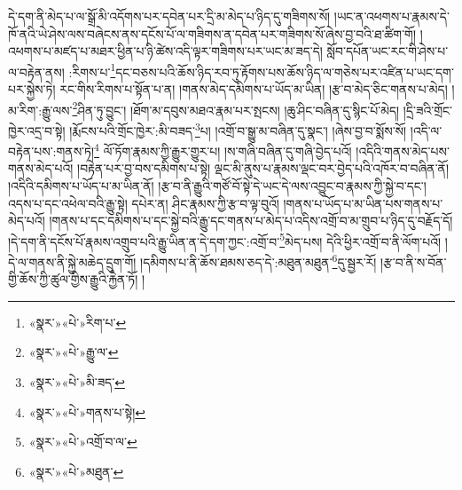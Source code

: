 དེ་དག་ནི་མེད་པ་ལ་སྒྲོ་མི་འདོགས་པར་དབེན་པར་དྲི་མ་མེད་པ་ཉིད་དུ་གཟིགས་སོ། །ཡང་ན་འཕགས་པ་རྣམས་དེ་ཁོ་ནའི་ཡེ་ཤེས་ལས་བཞེངས་ནས་དངོས་པོ་ལ་གཟིགས་ན་དབེན་པར་གཟིགས་སོ་ཞེས་བྱ་བའི་ཐ་ཚིག་གོ། །འཕགས་པ་མཛད་པ་མཐར་ཕྱིན་པ་ཉི་ཚེས་འདི་ལྟར་གཟིགས་པར་ཡང་མ་ཟད་དེ། སློབ་དཔོན་ཡང་རང་གི་ཤེས་པ་ལ་བརྟེན་ནས། :རིགས་པ་\footnote{«སྣར་»«པེ་»རིག་པ་}དང་བཅས་པའི་ཆོས་ཉིད་རབ་ཏུ་རྟོགས་པས་ཆོས་ཉིད་ལ་གཅེས་པར་འཛིན་པ་ཡང་དག་པར་སྐྱེས་ཏེ། རང་གིས་རིགས་པ་སྟོན་པ་ན། །གནས་མེད་དམིགས་པ་ཡོད་མ་ཡིན། །རྩ་བ་མེད་ཅིང་གནས་པ་མེད། །མ་རིག་:རྒྱུ་ལས་\footnote{«སྣར་»«པེ་»རྒྱུ་ལ་}ཤིན་ཏུ་བྱུང་། །ཐོག་མ་དབུས་མཐའ་རྣམ་པར་སྤངས། །ཆུ་ཤིང་བཞིན་དུ་སྙིང་པོ་མེད། །དྲི་ཟའི་གྲོང་ཁྱེར་འདྲ་བ་སྟེ། །རྨོངས་པའི་གྲོང་ཁྱེར་:མི་བཟད་\footnote{«སྣར་»«པེ་»མི་ཟད་}པ། །འགྲོ་བ་སྒྱུ་མ་བཞིན་དུ་སྣང་། །ཞེས་བྱ་བ་སྨོས་སོ། །འདི་ལ་བརྟེན་པས་:གནས་ཏེ།\footnote{«སྣར་»«པེ་»གནས་པ་སྟེ།} ལོ་ཏོག་རྣམས་ཀྱི་རྒྱུར་གྱུར་པ། །ས་གཞི་བཞིན་དུ་གཞི་བྱེད་པའོ། །འདིའི་གནས་མེད་པས་གནས་མེད་པའོ། །བརྟེན་པར་བྱ་བས་དམིགས་པ་སྟེ། ལྡང་མི་ནུས་པ་རྣམས་ལྡང་བར་བྱེད་པའི་འཁོར་བ་བཞིན་ནོ། །འདིའི་དམིགས་པ་ཡོད་པ་མ་ཡིན་ནོ། །རྩ་བ་ནི་རྒྱུའི་གཙོ་བོ་སྟེ་དེ་ཡང་དེ་ལས་འབྱུང་བ་རྣམས་ཀྱི་སྐྱེ་བ་དང་། འདས་པ་དང་འཕེལ་བའི་རྒྱུ་སྟེ། དཔེར་ན། ཤིང་རྣམས་ཀྱི་རྩ་བ་ལྟ་བུའོ། །གནས་པ་ཡོད་པ་མ་ཡིན་པས་གནས་པ་མེད་པའོ། །གནས་པ་དང་དམིགས་པ་དང་སྐྱེ་བའི་རྒྱུ་དང་གནས་པ་མེད་པ་འདིས་འགྲོ་བ་མ་གྲུབ་པ་ཉིད་དུ་བརྗོད་དོ། །དེ་དག་ནི་དངོས་པོ་རྣམས་འགྲུབ་པའི་རྒྱུ་ཡིན་ན་དེ་དག་ཀྱང་:འགྲོ་བ་\footnote{«སྣར་»«པེ་»འགྲོ་བ་ལ་}མེད་པས། དེའི་ཕྱིར་འགྲོ་བ་ནི་ལོག་པའོ། །དེ་ལ་གནས་ནི་སྐྱེ་མཆེད་དྲུག་གོ། །དམིགས་པ་ནི་ཆོས་ཐམས་ཅད་དེ་:མཐུན་མཐུན་\footnote{«སྣར་»«པེ་»མཐུན་}དུ་སྦྱར་རོ། །རྩ་བ་ནི་ས་བོན་གྱི་ཆོས་ཀྱི་ཚུལ་གྱིས་རྒྱུའི་རྐྱེན་ཏོ། །
